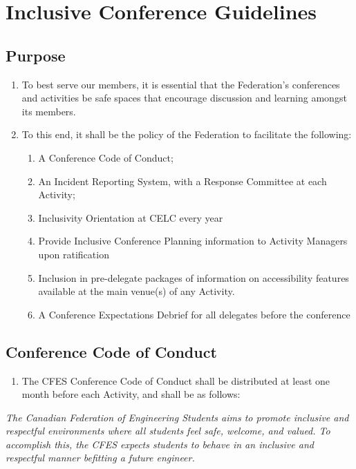 \section{Inclusive Conference Guidelines}
\label{inclusive-conference-guidelines}

\subsection{Purpose}
\label{purpose-3}

\begin{enumerate}
 \item
  To best serve our members, it is essential that the Federation's conferences and activities be safe spaces that encourage discussion and learning amongst its members.
 \item
  To this end, it shall be the policy of the Federation to facilitate the following:

  \begin{enumerate}
   \item
    A Conference Code of Conduct;
   \item
    An Incident Reporting System, with a Response Committee at each Activity;
   \item
    Inclusivity Orientation at CELC every year
   \item
    Provide Inclusive Conference Planning information to Activity Managers upon ratification
   \item
    Inclusion in pre-delegate packages of information on accessibility features available at the main venue(s) of any Activity.
   \item
    A Conference Expectations Debrief for all delegates before the conference
  \end{enumerate}
\end{enumerate}

\subsection{Conference Code of Conduct}
\label{conference-code-of-conduct}

\begin{enumerate}
 \item
  The CFES Conference Code of Conduct shall be distributed at least one month before each Activity, and shall be as follows:
\end{enumerate}

\emph{The Canadian Federation of Engineering Students aims to promote
 inclusive and respectful environments where all students feel safe,
 welcome, and valued. To accomplish this, the CFES expects students to
 behave in an inclusive and respectful manner befitting a future
 engineer.}

